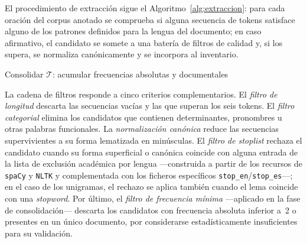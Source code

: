 El procedimiento de extracción sigue el Algoritmo~\ref{alg:extraccion}: para
cada oración del corpus anotado se comprueba si alguna secuencia de tokens
satisface alguno de los patrones definidos para la lengua del documento;
en caso afirmativo, el candidato se somete a una batería de filtros de
calidad y, si los supera, se normaliza canónicamente y se incorpora al
inventario.

\begin{algorithm}[H]
\caption{Extracción de candidatos a término.}
\label{alg:extraccion}
Consolidar $\mathcal{T}$: acumular frecuencias absolutas y documentales\;
\end{algorithm}

La cadena de filtros responde a cinco criterios complementarios. El
\textit{filtro de longitud} descarta las secuencias vacías y las que
superan los seis tokens. El \textit{filtro categorial} elimina los
candidatos que contienen determinantes, pronombres u otras palabras
funcionales. La \textit{normalización canónica} reduce las secuencias
supervivientes a su forma lematizada en minúsculas. El \textit{filtro de
\textit{stoplist}} rechaza el candidato cuando su forma superficial o
canónica coincide con alguna entrada de la lista de exclusión académica
por lengua ---construida a partir de los recursos de \texttt{spaCy} y
\texttt{NLTK} y complementada con los ficheros específicos
\texttt{stop\_en}/\texttt{stop\_es}---; en el caso de los unigramas, el
rechazo se aplica también cuando el lema coincide con una \textit{stopword}.
Por último, el \textit{filtro de frecuencia mínima} ---aplicado en la fase
de consolidación--- descarta los candidatos con frecuencia absoluta inferior
a~2 o presentes en un único documento, por considerarse estadísticamente
insuficientes para su validación.

